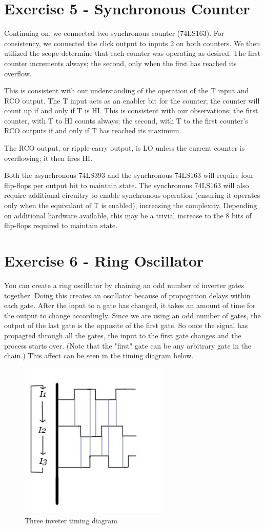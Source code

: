 \documentclass[paper=letter, fontsize=11pt]{scrartcl}
\begin{document}
\section{Exercise 5 - Synchronous Counter}
Continuing on, we connected two synchronous counter (74LS163). For consistency, we connected the click output to inputs 2 on both counters. We then utilized the scope determine that each counter was operating as desired. The first counter increments always; the second, only when the first has reached its overflow.

This is consistent with our understanding of the operation of the T input and RCO output. The T input acts as an enabler bit for the counter; the counter will count up if and only if T is HI. This is consistent with our observations; the first counter, with T to HI counts always; the second, with T to the first counter's RCO outputs if and only if T has reached its maximum.

The RCO output, or ripple-carry output, is LO unless the current counter is overflowing; it then fires HI.

Both the asynchronous 74LS393 and the synchronous 74LS163 will require four flip-flops per output bit to maintain state. The synchronous 74LS163 will also require additional circuitry to enable synchronous operation (ensuring it operates only when the equivalant of T is enabled), increasing the complexity. Depending on additional hardware available, this may be a trivial increase to the 8 bits of flip-flops required to maintain state.

\section{Exercise 6 - Ring Oscillator}
You can create a ring oscillator by chaining an odd number of inverter gates together. Doing this creates an oscillator because of propogation delays within each gate. After the input to a gate has changed, it takes an amount of time for the output to change accordingly. Since we are using an odd number of gates, the output of the last gate is the opposite of the first gate. So once the signal has propagted through all the gates, the input to the first gate changes and the process starts over. (Note that the "first" gate can be any arbitrary gate in the chain.) This affect can be seen in the timing diagram below.
\begin{figure}[H]
\includegraphics[height=75mm]{timing_diagram.png}
\centering
\caption{Three inveter timing diagram}
\label{overflow}
\end{figure}
\end{document}
